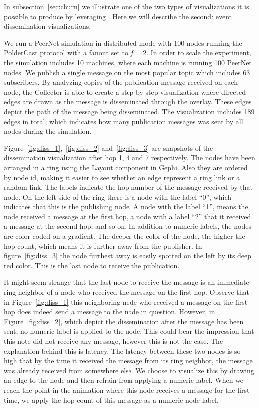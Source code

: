 In subsection~\ref{sec:churn} we illustrate one of the two types of
visualizations it is possible to produce by leveraging \demo. Here we will describe the second:
event dissemination visualizations.

We run a PeerNet simulation in distributed mode with 100 nodes running
the PolderCast protocol with a fanout set to $f=2$. In order to scale
the experiment, the simulation includes 10 machines, where each machine
is running 100 PeerNet nodes.  We publish a single message on the
most popular topic which includes 63 subscribers. By analyzing copies of
the publication message received on each node, the Collector is able to
create a step-by-step visualization where directed edges are drawn as
the message is disseminated through the overlay.  These edges depict the
path of the message being disseminated. The visualization includes 189
edges in total, which indicates how many publication messages was sent
by all nodes during the simulation.

Figure~\ref{fig:diss_1},~\ref{fig:diss_2} and~\ref{fig:diss_3} are
snapshots of the dissemination visualization after hop 1, 4 and 7
respectively. The nodes have been arranged in a ring using the Layout
component in Gephi. Also they are ordered by node id, making it easier
to see whether an edge represent a ring link or a random link. The
labels indicate the hop number of the message received by that node. On
the left side of the ring there is a node with the label ``0'', which
indicates that this is the publishing node. A node with the label ``1'',
means the node received a message at the first hop, a node with a label
``2'' that it received a message at the second hop, and so on. In
addition to numeric labels, the nodes are color coded on a gradient. The
deeper the color of the node, the higher the hop count, which means it
is further away from the publisher. In figure~\ref{fig:diss_3} the node
furthest away is easily spotted on the left by its deep red color. This
is the last node to receive the publication.

It might seem strange that the last node to receive the message is an
immediate ring neighbor of a node who received the message on the first
hop. Observe that in Figure~\ref{fig:diss_1} this neighboring node who
received a message on the first hop does indeed send a message to the
node in question. However, in Figure~\ref{fig:diss_2}, which depict the
dissemination after the message has been sent, no numeric label is
applied to the node. This could bear the impression that this note did
not receive any message, however this is not the case. The explanation
behind this is latency. The latency between these two nodes is so high
that by the time it received the message from its ring neighbor, the
message was already received from somewhere else. We choose to visualize
this by drawing an edge to the node and then refrain from applying a
numeric label. When we reach the point in the animation where this node
receives a message for the first time, we apply the hop count of this
message as a numeric node label.

